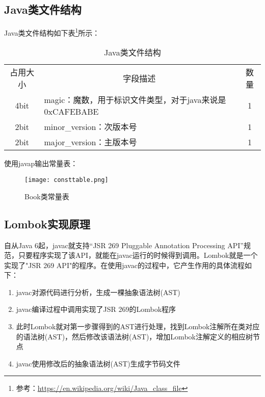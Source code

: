 \documentclass[../../../interview-questions.tex]{subfiles}
\begin{document}
\subsection{Java类文件结构}

Java类文件结构如下表\footnote{参考：\url{https://en.wikipedia.org/wiki/Java_class_file}}所示：

\begin{table}[htbp]
	\caption{Java类文件结构}
	\label{table:mapo2}
	\begin{center}
		\begin{tabular}{cp{5cm}c}
			\hline
			\multirow{1}{*}{占用大小}
			& \multicolumn{1}{c}{字段描述} 
			& \multicolumn{1}{c}{数量}\\			
			\cline{1-3}
			4bit &  magic：魔数，用于标识文件类型，对于java来说是0xCAFEBABE  &  1 \\
			\hline
			2bit &  minor\_version：次版本号 & 1 \\
			\hline
			2bit &  major\_version：主版本号 & 1 \\
			\hline							
		\end{tabular}	
	\end{center}
\end{table}

使用javap输出常量表：

\begin{figure}[htbp]
	\centering
	\texttt{[image: consttable.png]}
	\caption{Book类常量表}
	\label{fig:consttable}
\end{figure}


\subsection{Lombok实现原理}

自从Java 6起，javac就支持“JSR 269 Pluggable Annotation Processing API”规范，只要程序实现了该API，就能在javac运行的时候得到调用。Lombok就是一个实现了"JSR 269 API"的程序。在使用javac的过程中，它产生作用的具体流程如下：

\begin{enumerate}
\item {javac对源代码进行分析，生成一棵抽象语法树(AST)}
\item{javac编译过程中调用实现了JSR 269的Lombok程序}
\item{此时Lombok就对第一步骤得到的AST进行处理，找到Lombok注解所在类对应的语法树(AST)，然后修改该语法树(AST)，增加Lombok注解定义的相应树节点}
\item{javac使用修改后的抽象语法树(AST)生成字节码文件}
\end{enumerate}
\end{document}
